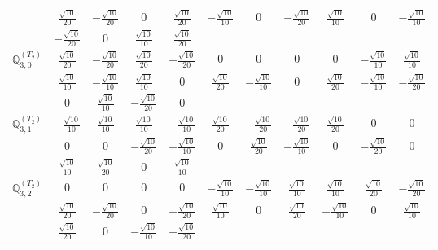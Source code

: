 \documentclass[fleqn,10pt,landscape]{article}
\begin{document}
\begin{itemize}
{\begin{center}
\begin{longtable}{ccccccccccc}
& $ \frac{\sqrt{10}}{20} $ & $ - \frac{\sqrt{10}}{20} $ & $ 0 $ & $ \frac{\sqrt{10}}{20} $ & $ - \frac{\sqrt{10}}{10} $ & $ 0 $ & $ - \frac{\sqrt{10}}{20} $ & $ \frac{\sqrt{10}}{10} $ & $ 0 $ & $ - \frac{\sqrt{10}}{10} $ \\
& $ - \frac{\sqrt{10}}{20} $ & $ 0 $ & $ \frac{\sqrt{10}}{10} $ & $ \frac{\sqrt{10}}{20} $ & $  $ & $  $ & $  $ & $  $ & $  $ & $  $ \\ \hline
$\mathbb{Q}_{3,0}^{(T_{2})}$ & $ \frac{\sqrt{10}}{20} $ & $ - \frac{\sqrt{10}}{20} $ & $ \frac{\sqrt{10}}{20} $ & $ - \frac{\sqrt{10}}{20} $ & $ 0 $ & $ 0 $ & $ 0 $ & $ 0 $ & $ - \frac{\sqrt{10}}{10} $ & $ \frac{\sqrt{10}}{10} $ \\
& $ \frac{\sqrt{10}}{10} $ & $ - \frac{\sqrt{10}}{10} $ & $ \frac{\sqrt{10}}{10} $ & $ 0 $ & $ \frac{\sqrt{10}}{20} $ & $ - \frac{\sqrt{10}}{10} $ & $ 0 $ & $ \frac{\sqrt{10}}{20} $ & $ - \frac{\sqrt{10}}{10} $ & $ - \frac{\sqrt{10}}{20} $ \\
& $ 0 $ & $ \frac{\sqrt{10}}{10} $ & $ - \frac{\sqrt{10}}{20} $ & $ 0 $ & $  $ & $  $ & $  $ & $  $ & $  $ & $  $ \\ \hline
$\mathbb{Q}_{3,1}^{(T_{2})}$ & $ - \frac{\sqrt{10}}{10} $ & $ \frac{\sqrt{10}}{10} $ & $ \frac{\sqrt{10}}{10} $ & $ - \frac{\sqrt{10}}{10} $ & $ \frac{\sqrt{10}}{20} $ & $ - \frac{\sqrt{10}}{20} $ & $ - \frac{\sqrt{10}}{20} $ & $ \frac{\sqrt{10}}{20} $ & $ 0 $ & $ 0 $ \\
& $ 0 $ & $ 0 $ & $ - \frac{\sqrt{10}}{20} $ & $ - \frac{\sqrt{10}}{10} $ & $ 0 $ & $ \frac{\sqrt{10}}{20} $ & $ - \frac{\sqrt{10}}{10} $ & $ 0 $ & $ - \frac{\sqrt{10}}{20} $ & $ 0 $ \\
& $ \frac{\sqrt{10}}{10} $ & $ \frac{\sqrt{10}}{20} $ & $ 0 $ & $ \frac{\sqrt{10}}{10} $ & $  $ & $  $ & $  $ & $  $ & $  $ & $  $ \\ \hline
$\mathbb{Q}_{3,2}^{(T_{2})}$ & $ 0 $ & $ 0 $ & $ 0 $ & $ 0 $ & $ - \frac{\sqrt{10}}{10} $ & $ - \frac{\sqrt{10}}{10} $ & $ \frac{\sqrt{10}}{10} $ & $ \frac{\sqrt{10}}{10} $ & $ \frac{\sqrt{10}}{20} $ & $ - \frac{\sqrt{10}}{20} $ \\
& $ \frac{\sqrt{10}}{20} $ & $ - \frac{\sqrt{10}}{20} $ & $ 0 $ & $ - \frac{\sqrt{10}}{20} $ & $ \frac{\sqrt{10}}{10} $ & $ 0 $ & $ \frac{\sqrt{10}}{20} $ & $ - \frac{\sqrt{10}}{10} $ & $ 0 $ & $ \frac{\sqrt{10}}{10} $ \\
& $ \frac{\sqrt{10}}{20} $ & $ 0 $ & $ - \frac{\sqrt{10}}{10} $ & $ - \frac{\sqrt{10}}{20} $ & $  $ & $  $ & $  $ & $  $ & $  $ & $  $ \\ \hline

\end{longtable}
\end{center}}
\end{itemize}
\end{document}
